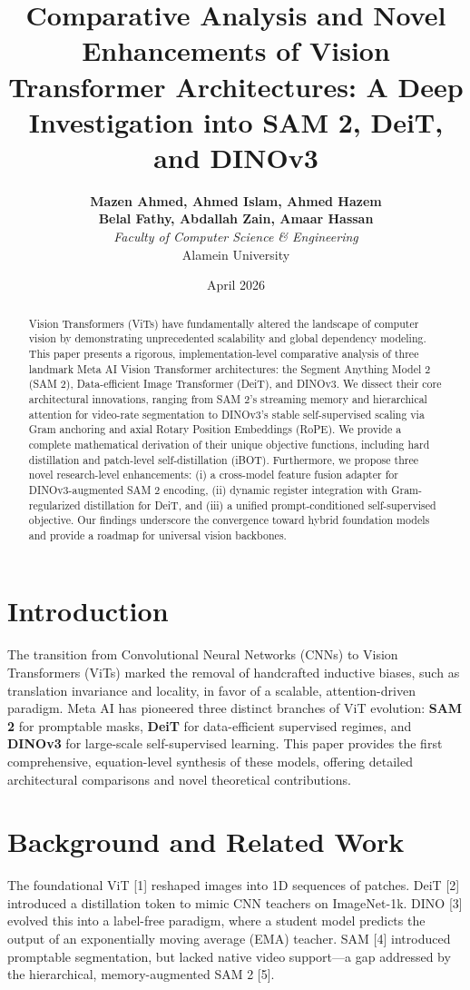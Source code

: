 \documentclass[twocolumn,10pt,a4paper]{article}
\title{\textbf{Comparative Analysis and Novel Enhancements of Vision Transformer Architectures: A Deep Investigation into SAM 2, DeiT, and DINOv3}}
\author{
    \textbf{Mazen Ahmed, Ahmed Islam, Ahmed Hazem} \\
    \textbf{Belal Fathy, Abdallah Zain, Amaar Hassan} \\
    \textit{Faculty of Computer Science \& Engineering} \\
    Alamein University
}
\date{April 2026}
\begin{document}
\maketitle

\begin{abstract}
Vision Transformers (ViTs) have fundamentally altered the landscape of computer vision by demonstrating unprecedented scalability and global dependency modeling. This paper presents a rigorous, implementation-level comparative analysis of three landmark Meta AI Vision Transformer architectures: the Segment Anything Model 2 (SAM 2), Data-efficient Image Transformer (DeiT), and DINOv3. We dissect their core architectural innovations, ranging from SAM 2’s streaming memory and hierarchical attention for video-rate segmentation to DINOv3’s stable self-supervised scaling via Gram anchoring and axial Rotary Position Embeddings (RoPE). We provide a complete mathematical derivation of their unique objective functions, including hard distillation and patch-level self-distillation (iBOT). Furthermore, we propose three novel research-level enhancements: (i) a cross-model feature fusion adapter for DINOv3-augmented SAM 2 encoding, (ii) dynamic register integration with Gram-regularized distillation for DeiT, and (iii) a unified prompt-conditioned self-supervised objective. Our findings underscore the convergence toward hybrid foundation models and provide a roadmap for universal vision backbones.
\end{abstract}

\section{Introduction}
The transition from Convolutional Neural Networks (CNNs) to Vision Transformers (ViTs) marked the removal of handcrafted inductive biases, such as translation invariance and locality, in favor of a scalable, attention-driven paradigm. Meta AI has pioneered three distinct branches of ViT evolution: \textbf{SAM 2} for promptable masks, \textbf{DeiT} for data-efficient supervised regimes, and \textbf{DINOv3} for large-scale self-supervised learning. This paper provides the first comprehensive, equation-level synthesis of these models, offering detailed architectural comparisons and novel theoretical contributions.

\section{Background and Related Work}
The foundational ViT [1] reshaped images into 1D sequences of patches. DeiT [2] introduced a distillation token to mimic CNN teachers on ImageNet-1k. DINO [3] evolved this into a label-free paradigm, where a student model predicts the output of an exponentially moving average (EMA) teacher. SAM [4] introduced promptable segmentation, but lacked native video support—a gap addressed by the hierarchical, memory-augmented SAM 2 [5].
\end{document}
